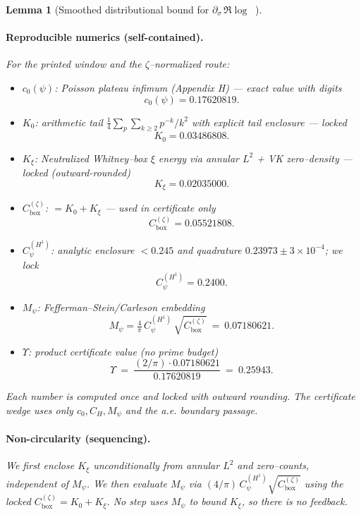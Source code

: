 \documentclass[11pt]{article}
\providecommand{\Kxi}{0.02035000}%
\providecommand{\CboxZeta}{0.05521808}%
\providecommand{\Mpsilocked}{0.07180621}%
\providecommand{\UpsilonLocked}{0.25943}%
\newtheorem{lemma}[theorem]{Lemma}
\theoremstyle{definition}
\theoremstyle{remark}
\DeclareMathOperator{\dettwo}{det_2}
\begin{document}
\begin{lemma}[Smoothed distributional bound for $\partial_\sigma\,\Re\log\dettwo$]
\paragraph{Reproducible numerics (self-contained).}
For the printed window and the \(\zeta\)–normalized route:
\begin{itemize}
\item \(c_0(\psi)\): Poisson plateau infimum (Appendix H) — exact value with digits
\[ c_0(\psi)=0.17620819. \]
\item \(K_0\): arithmetic tail \(\tfrac14\sum_{p}\sum_{k\ge2} p^{-k}/k^2\) with explicit tail enclosure — locked
\[ K_0=0.03486808. \]
\item \(K_\xi\): Neutralized Whitney–box \(\xi\) energy via annular $L^2$ + VK zero–density — locked (outward-rounded)
\[ K_\xi=\Kxi. \]
\item \(C_{\mathrm{box}}^{(\zeta)}\): $=K_0+K_\xi$ — used in certificate only
\[ C_{\mathrm{box}}^{(\zeta)}=\CboxZeta. \]
\item \(C_\psi^{(H^1)}\): analytic enclosure $<0.245$ and quadrature $0.23973\pm3\times10^{-4}$; we lock
\[ C_\psi^{(H^1)}=0.2400. \]
\item \(M_\psi\): Fefferman–Stein/Carleson embedding
\[ M_\psi=\tfrac{4}{\pi}\,C_\psi^{(H^1)}\,\sqrt{C_{\mathrm{box}}^{(\zeta)}}\ =\ \Mpsilocked. \]
\item \(\Upsilon\): product certificate value (no prime budget)
\[ \Upsilon\ =\ \frac{(2/\pi)\cdot \Mpsilocked}{0.17620819}\ =\ \UpsilonLocked. \]
\end{itemize}
Each number is computed once and locked with outward rounding. The certificate wedge uses only \(c_0, C_H, M_\psi\) and the a.e. boundary passage.

\paragraph{Non-circularity (sequencing).}
We first enclose \(K_\xi\) unconditionally from annular $L^2$ and zero–counts, independent of \(M_\psi\). We then evaluate \(M_\psi\) via \((4/\pi)\,C_\psi^{(H^1)}\sqrt{C_{\mathrm{box}}^{(\zeta)}}\) using the locked \(C_{\mathrm{box}}^{(\zeta)}=K_0+K_\xi\). No step uses \(M_\psi\) to bound \(K_\xi\), so there is no feedback.



\end{lemma}
\end{document}
